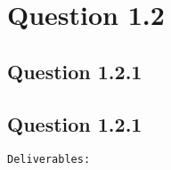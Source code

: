 \section*{Question 1.2}

\subsection*{Question 1.2.1}

	

\subsection*{Question 1.2.1} \texttt{Deliverables:} 
	
	
